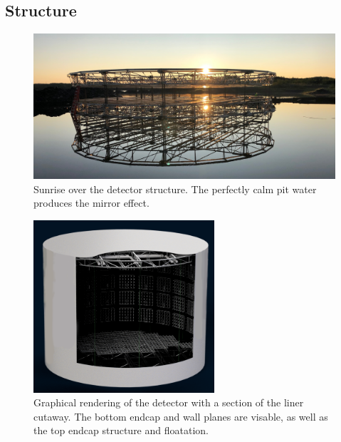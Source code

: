 \subsection{Structure} %
\label{sec:chips_detector_structure} %

\begin{figure} %
    \includegraphics[width=\textwidth]{diagrams/4-chips/sunrise_short.jpeg}
    \caption[Sunrise over the \chips detector.]
    {Sunrise over the \chips detector structure. The perfectly calm pit water
        produces the mirror effect.}
    \label{fig:sunrise}
\end{figure}

\begin{figure} %
    \includegraphics[width=0.6\textwidth]{diagrams/4-chips/chips_render_1.png}
    \caption[Graphical rendering of the \chipsfive detector with liner cutaway.]
    {Graphical rendering of the \chipsfive detector with a section of the liner cutaway.
        The bottom endcap and wall planes are visable,
        as well as the top endcap structure and floatation.}
    \label{fig:chips_render_1}
\end{figure}

